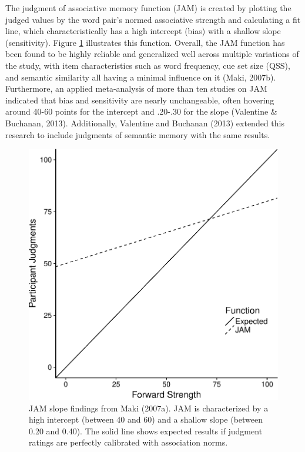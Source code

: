\documentclass[english,man]{apa6}
\theoremstyle{definition}
\theoremstyle{definition}
\theoremstyle{definition}
\theoremstyle{remark}
\begin{document}
The judgment of associative memory function (JAM) is created by plotting
the judged values by the word pair's normed associative strength and
calculating a fit line, which characteristically has a high intercept
(bias) with a shallow slope (sensitivity). Figure \ref{fig:makislope}
illustrates this function. Overall, the JAM function has been found to
be highly reliable and generalized well across multiple variations of
the study, with item characteristics such as word frequency, cue set
size (QSS), and semantic similarity all having a minimal influence on it
(Maki, 2007b). Furthermore, an applied meta-analysis of more than ten
studies on JAM indicated that bias and sensitivity are nearly
unchangeable, often hovering around 40-60 points for the intercept and
.20-.30 for the slope (Valentine \& Buchanan, 2013). Additionally,
Valentine and Buchanan (2013) extended this research to include
judgments of semantic memory with the same results.

\begin{figure}
\centering
\includegraphics{max_buch_JOL_files/figure-latex/makislope-1.pdf}
\caption{\label{fig:makislope}JAM slope findings from Maki (2007a). JAM is
characterized by a high intercept (between 40 and 60) and a shallow
slope (between 0.20 and 0.40). The solid line shows expected results if
judgment ratings are perfectly calibrated with association norms.}
\end{figure}
\end{document}
